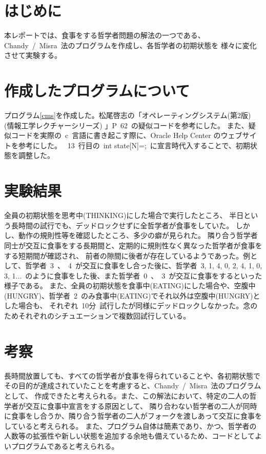 \documentclass[10pt]{jarticle}
\title{\framebox{\hspace{4zw}オペレーティングシステム論 レポート2%
                 \hspace{4zw}}}
\author{神野　友哉 \\
        2022311042  \\
        愛知県立大学 情報科学部 情報科学科}
\date{2024年1月9日}
\begin{document}
\maketitle

\section{はじめに} \label{sec:hajime}
%
本レポートでは、食事をする哲学者問題の解法の一つである、Chandy\ /\ Misra\ 法のプログラムを作成し、各哲学者の初期状態を
様々に変化させて実験する。
%

\section{作成したプログラムについて} \label{sec:pro}
%
プログラム\ref{cms}を作成した。松尾啓志の「オペレーティングシステム(第2版) (情報工学レクチャーシリーズ) 」P\ 62\ の疑似コードを参考にした\cite{ope}。
また、疑似コードを実際の\ c\ 言語に書き起こす際に、Oracle Help Center のウェブサイトを参考にした\cite{csema}。
\ 13\ 行目の\ int state[N]={};\ に宣言時代入することで、初期状態を調整した。

%

\section{実験結果} \label{sec:kekka}
%
全員の初期状態を思考中(THINKING)にした場合で実行したところ、
半日という長時間の試行でも、デッドロックせずに全哲学者が食事をしていた。
しかし、動作の規則性等を確認したところ、多少の癖が見られた。
隣り合う哲学者同士が交互に食事をする長期間と、定期的に規則性なく異なった哲学者が食事をする短期間が確認され、
前者の隙間に後者が存在しているようであった。例として、哲学者\ 3\ 、\ 4\ が交互に食事をし合った後に、哲学者\ 3, 1, 4, 0, 2, 4, 1, 0, 3, 1...\ 
のように食事をした後、また哲学者\ 0\ 、\ 3\ が交互に食事をするといった様子である。
また、全員の初期状態を食事中(EATING)にした場合や、空腹中(HUNGRY)、哲学者\ 2\ のみ食事中(EATING)でそれ以外は空腹中(HUNGRY)とした場合も、
それぞれ\ 10分\ 試行したが同様にデッドロックしなかった。念のためそれぞれのシチュエーションで複数回試行している。

%

\section{考察} \label{sec:kosatu}
%
長時間放置しても、すべての哲学者が食事を得られていることや、各初期状態でその目的が達成されていたことを考慮すると、Chandy\ /\ Misra\ 法のプログラムとして、
作成できたと考えられる。また、この解法において、特定の二人の哲学者が交互に食事中宣言をする原因として、
隣り合わない哲学者の二人が同時に食事をし合うか、隣り合う哲学者の二人がフォークを渡しあって交互に食事をしていると考えられる。
また、プログラム自体は簡素であり、かつ、哲学者の人数等の拡張性や新しい状態を追加する余地も備えているため、コードとしてよいプログラムであると考えられる。
%
\end{document}
